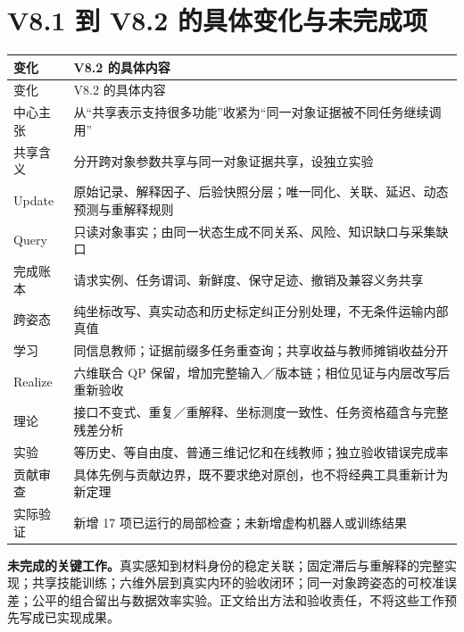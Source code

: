 \documentclass[UTF8,11pt,a4paper,fontset=fandol]{ctexart}
\numberwithin{equation}{section}
\theoremstyle{definition}
\begin{document}
\section{V8.1 到 V8.2 的具体变化与未完成项}
\label{app:changes}
\begin{longtable}{P{40mm}P{108mm}}
\toprule
变化 & V8.2 的具体内容\\\midrule\endfirsthead
\toprule 变化 & V8.2 的具体内容\\\midrule\endhead
中心主张 & 从“共享表示支持很多功能”收紧为“同一对象证据被不同任务继续调用”\\
共享含义 & 分开跨对象参数共享与同一对象证据共享，设独立实验\\
Update & 原始记录、解释因子、后验快照分层；唯一同化、关联、延迟、动态预测与重解释规则\\
Query & 只读对象事实；由同一状态生成不同关系、风险、知识缺口与采集缺口\\
完成账本 & 请求实例、任务谓词、新鲜度、保守足迹、撤销及兼容义务共享\\
跨姿态 & 纯坐标改写、真实动态和历史标定纠正分别处理，不无条件运输内部真值\\
学习 & 同信息教师；证据前缀多任务重查询；共享收益与教师摊销收益分开\\
Realize & 六维联合 QP 保留，增加完整输入／版本链；相位见证与内层改写后重新验收\\
理论 & 接口不变式、重复／重解释、坐标测度一致性、任务资格蕴含与完整残差分析\\
实验 & 等历史、等自由度、普通三维记忆和在线教师；独立验收错误完成率\\
贡献审查 & 具体先例与贡献边界，既不要求绝对原创，也不将经典工具重新计为新定理\\
实际验证 & 新增 17 项已运行的局部检查；未新增虚构机器人或训练结果\\\bottomrule
\end{longtable}

\textbf{未完成的关键工作。}真实感知到材料身份的稳定关联；固定滞后与重解释的完整实现；共享技能训练；六维外层到真实内环的验收闭环；同一对象跨姿态的可校准误差；公平的组合留出与数据效率实验。正文给出方法和验收责任，不将这些工作预先写成已实现成果。
\end{document}
